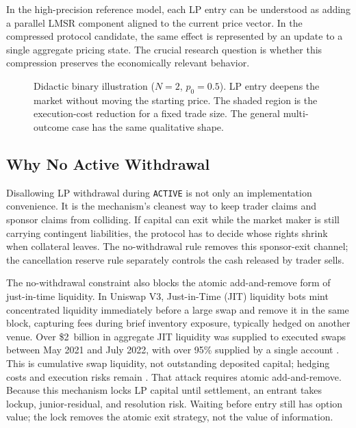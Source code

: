 \documentclass[10pt]{article}
\begin{document}
In the high-precision reference model, each LP entry can be understood as adding a parallel LMSR component aligned to the current price vector. In the compressed protocol candidate, the same effect is represented by an update to a single aggregate pricing state. The crucial research question is whether this compression preserves the economically relevant behavior.

\begin{figure}[t]
\centering
\resizebox{\linewidth}{!}{}
\caption{Didactic binary illustration ($N{=}2$, $p_0{=}0.5$). LP entry deepens the market without moving the starting price. The shaded region is the execution-cost reduction for a fixed trade size. The general multi-outcome case has the same qualitative shape.}
\label{fig:slippage}
\end{figure}

\subsection{Why No Active Withdrawal}

Disallowing LP withdrawal during \texttt{ACTIVE} is not only an implementation convenience. It is the mechanism's cleanest way to keep trader claims and sponsor claims from colliding. If capital can exit while the market maker is still carrying contingent liabilities, the protocol has to decide whose rights shrink when collateral leaves. The no-withdrawal rule removes this sponsor-exit channel; the cancellation reserve rule separately controls the cash released by trader sells.

The no-withdrawal constraint also blocks the atomic add-and-remove form of just-in-time liquidity. In Uniswap V3, Just-in-Time (JIT) liquidity bots mint concentrated liquidity immediately before a large swap and remove it in the same block, capturing fees during brief inventory exposure, typically hedged on another venue. Over \$2~billion in aggregate JIT liquidity was supplied to executed swaps between May 2021 and July 2022, with over 95\% supplied by a single account \cite{uniswapjit2022}. This is cumulative swap liquidity, not outstanding deposited capital; hedging costs and execution risks remain \cite{jitliquidity2023}. That attack requires atomic add-and-remove. Because this mechanism locks LP capital until settlement, an entrant takes lockup, junior-residual, and resolution risk. Waiting before entry still has option value; the lock removes the atomic exit strategy, not the value of information.
\end{document}
